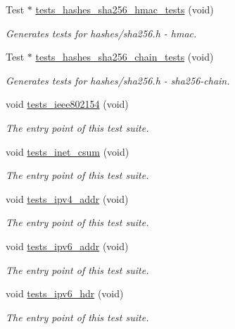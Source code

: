 \begin{DoxyCompactItemize}
Test $\ast$ \hyperlink{group__unittests_ga7a35b0db09ca01c1e2567b95bcd06227}{tests\+\_\+hashes\+\_\+sha256\+\_\+hmac\+\_\+tests} (void)
\begin{DoxyCompactList}\small\item\em Generates tests for hashes/sha256.\+h -\/ hmac. \end{DoxyCompactList}\item 
Test $\ast$ \hyperlink{group__unittests_ga31217f1c8fb68025a8a9a17e1a9359b3}{tests\+\_\+hashes\+\_\+sha256\+\_\+chain\+\_\+tests} (void)
\begin{DoxyCompactList}\small\item\em Generates tests for hashes/sha256.\+h -\/ sha256-\/chain. \end{DoxyCompactList}\item 
void \hyperlink{group__unittests_ga610840bb2928eb0ca34a53f887a7e884}{tests\+\_\+ieee802154} (void)
\begin{DoxyCompactList}\small\item\em The entry point of this test suite. \end{DoxyCompactList}\item 
void \hyperlink{group__unittests_gadfd01b88a3279960c0a209c588d7e733}{tests\+\_\+inet\+\_\+csum} (void)
\begin{DoxyCompactList}\small\item\em The entry point of this test suite. \end{DoxyCompactList}\item 
void \hyperlink{group__unittests_ga629b2fe7a5d7d0f1623fbb0859868246}{tests\+\_\+ipv4\+\_\+addr} (void)
\begin{DoxyCompactList}\small\item\em The entry point of this test suite. \end{DoxyCompactList}\item 
void \hyperlink{group__unittests_gaa968d7cf1c200e4ec0394693683d8260}{tests\+\_\+ipv6\+\_\+addr} (void)
\begin{DoxyCompactList}\small\item\em The entry point of this test suite. \end{DoxyCompactList}\item 
void \hyperlink{group__unittests_ga24225364efd039f0cdd38e4286bed7c5}{tests\+\_\+ipv6\+\_\+hdr} (void)
\begin{DoxyCompactList}\small\item\em The entry point of this test suite. \end{DoxyCompactList}\item 

\end{DoxyCompactItemize}
